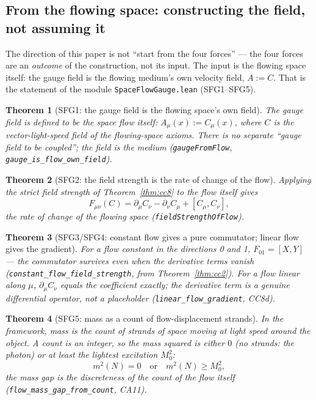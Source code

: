 \documentclass[aps,prd,preprint,superscriptaddress,amsmath,amssymb]{revtex4-2}
\newtheorem{theorem}{Theorem}[section]
\begin{document}
\subsection{From the flowing space: constructing the field, not assuming it}
\label{sec:flow-construction}

The direction of this paper is not ``start from the four forces'' ---
the four forces are an \emph{outcome} of the construction, not its
input.  The input is the flowing space itself: the gauge field is the
flowing medium's own velocity field, $A:=C$.  That is the statement
of the module \texttt{SpaceFlowGauge.lean} (SFG1--SFG5).

\begin{theorem}[SFG1: the gauge field is the flowing space's own field]
\label{thm:sfg1}
The gauge field is defined to be the space flow itself:
$A_\mu(x):=C_\mu(x)$, where $C$ is the vector-light-speed field of the
flowing-space axioms.  There is no separate ``gauge field to be
coupled''; the field is the medium
(\texttt{gaugeFromFlow}, \texttt{gauge\_is\_flow\_own\_field}).
\end{theorem}

\begin{theorem}[SFG2: the field strength is the rate of change of the flow]
\label{thm:sfg2}
Applying the strict field strength of
Theorem~\ref{thm:cc8} to the flow itself gives
\begin{equation}
F_{\mu\nu}(C)=\partial_\mu C_\nu-\partial_\nu C_\mu+[C_\mu,C_\nu],
\label{eq:flow-F}
\end{equation}
the rate of change of the flowing space
(\texttt{fieldStrengthOfFlow}).
\end{theorem}

\begin{theorem}[SFG3/SFG4: constant flow gives a pure commutator; linear flow gives the gradient]
\label{thm:sfg3}
For a flow constant in the directions 0 and 1, $F_{01}=[X,Y]$ --- the
commutator survives even when the derivative terms vanish
(\texttt{constant\_flow\_field\_strength}, from Theorem~\ref{thm:cc2}).
For a flow linear along $\mu$, $\partial_\mu C_\nu$ equals the
coefficient exactly; the derivative term is a genuine differential
operator, not a placeholder
(\texttt{linear\_flow\_gradient}, CC8d).
\end{theorem}

\begin{theorem}[SFG5: mass as a count of flow-displacement strands]
\label{thm:sfg5}
In the framework, mass is the \emph{count of strands} of space moving
at light speed around the object.  A count is an integer, so the mass
squared is either $0$ (no strands: the photon) or at least the
lightest excitation $M_0^2$:
\begin{equation}
m^2(N)=0 \quad\text{or}\quad m^2(N)\ge M_0^2,
\label{eq:sfg-gap}
\end{equation}
the mass gap is the discreteness of the count of the flow itself
(\texttt{flow\_mass\_gap\_from\_count}, CA11).
\end{theorem}
\end{document}
